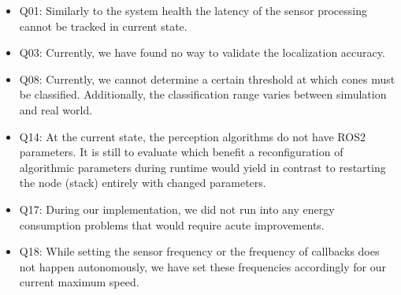 \begin{itemize}
	\item Q01: Similarly to the system health the latency of the sensor processing cannot be tracked in current state.
	\item Q03: Currently, we have found no way to validate the localization accuracy.
	\item Q08: Currently, we cannot determine a certain threshold at which cones must be classified. Additionally, the classification range varies between simulation and real world.
	\item Q14: At the current state, the perception algorithms do not have ROS2 parameters. It is still to evaluate which benefit a reconfiguration of algorithmic parameters during runtime would yield in contrast to restarting the node (stack) entirely with changed parameters.
	\item Q17: During our implementation, we did not run into any energy consumption problems that would require acute improvements.
	\item Q18: While setting the sensor frequency or the frequency of callbacks does not happen autonomously, we have set these frequencies accordingly for our current maximum speed.
\end{itemize}